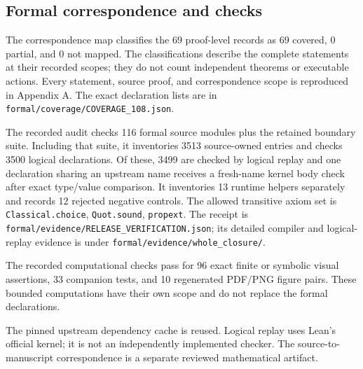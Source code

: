 \subsection{Formal correspondence and checks}
The correspondence map classifies the 69 proof-level records as 69 covered, 0 partial, and 0 not mapped. The classifications describe the complete statements at their recorded scopes; they do not count independent theorems or executable actions. Every statement, source proof, and correspondence scope is reproduced in Appendix A. The exact declaration lists are in \nolinkurl{formal/coverage/COVERAGE_108.json}.

The recorded audit checks 116 formal source modules plus the retained boundary suite. Including that suite, it inventories 3513 source-owned entries and checks 3500 logical declarations. Of these, 3499 are checked by logical replay and one declaration sharing an upstream name receives a fresh-name kernel body check after exact type/value comparison. It inventories 13 runtime helpers separately and records 12 rejected negative controls. The allowed transitive axiom set is \nolinkurl{Classical.choice}, \nolinkurl{Quot.sound}, \nolinkurl{propext}. The receipt is \nolinkurl{formal/evidence/RELEASE_VERIFICATION.json}; its detailed compiler and logical-replay evidence is under \nolinkurl{formal/evidence/whole_closure/}.

The recorded computational checks pass for 96 exact finite or symbolic visual assertions, 33 companion tests, and 10 regenerated PDF/PNG figure pairs. These bounded computations have their own scope and do not replace the formal declarations.

The pinned upstream dependency cache is reused. Logical replay uses Lean's official kernel; it is not an independently implemented checker. The source-to-manuscript correspondence is a separate reviewed mathematical artifact.
